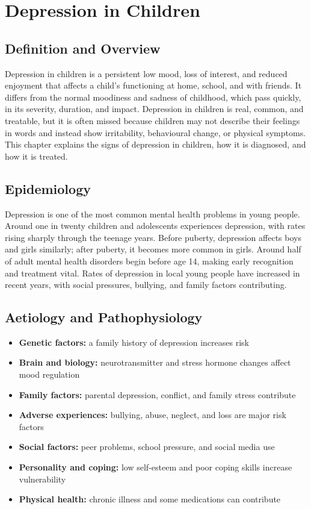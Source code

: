 \chapter{Depression in Children}

\section*{Definition and Overview}
Depression in children is a persistent low mood, loss of interest, and reduced enjoyment that affects a child's functioning at home, school, and with friends. It differs from the normal moodiness and sadness of childhood, which pass quickly, in its severity, duration, and impact. Depression in children is real, common, and treatable, but it is often missed because children may not describe their feelings in words and instead show irritability, behavioural change, or physical symptoms. This chapter explains the signs of depression in children, how it is diagnosed, and how it is treated.

\section*{Epidemiology}
Depression is one of the most common mental health problems in young people. Around one in twenty children and adolescents experiences depression, with rates rising sharply through the teenage years. Before puberty, depression affects boys and girls similarly; after puberty, it becomes more common in girls. Around half of adult mental health disorders begin before age 14, making early recognition and treatment vital. Rates of depression in local young people have increased in recent years, with social pressures, bullying, and family factors contributing.

\section*{Aetiology and Pathophysiology}
\begin{itemize}
    \item \textbf{Genetic factors:} a family history of depression increases risk
    \item \textbf{Brain and biology:} neurotransmitter and stress hormone changes affect mood regulation
    \item \textbf{Family factors:} parental depression, conflict, and family stress contribute
    \item \textbf{Adverse experiences:} bullying, abuse, neglect, and loss are major risk factors
    \item \textbf{Social factors:} peer problems, school pressure, and social media use
    \item \textbf{Personality and coping:} low self-esteem and poor coping skills increase vulnerability
    \item \textbf{Physical health:} chronic illness and some medications can contribute
\end{itemize}

